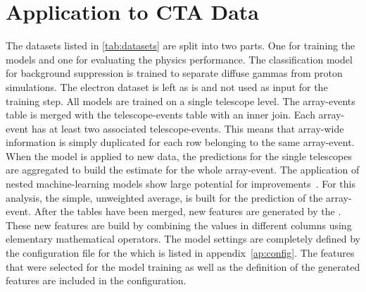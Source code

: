 \section{Application to CTA Data}
\label{sec:results}
The datasets listed in \cref{tab:datasets} are split into two parts. One for training the models and one for evaluating the physics performance.
The classification model for background suppression is trained to separate diffuse gammas from proton simulations. 
The electron dataset is left as is and not used as input for the training step.
All models are trained on a single telescope level. 
The array-events table is merged with the telescope-events table with an inner join.
Each array-event has at least two associated telescope-events. 
This means that array-wide information is simply duplicated for each row belonging to the same array-event. 
When the model is applied to new data, the predictions for the single telescopes are aggregated to build the 
estimate for the whole array-event. The application of nested machine-learning models show large potential for improvements~\cite{ba_lars}. 
For this analysis, the simple, unweighted average, is built for the prediction of the array-event. 
After the tables have been merged, new features are generated by the \aicttools. 
These new features are build by combining the values in different columns using elementary mathematical operators.
The model settings are completely defined by the configuration file for the \aicttools which is listed in appendix~\ref{ap:config}. 
The features that were selected for the model training as well as the definition of the generated features are included in the configuration.

